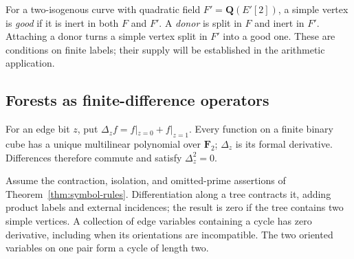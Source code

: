 For a two-isogenous curve with quadratic field $F'=\mathbf Q(E'[2])$,
a simple vertex is \emph{good} if it is inert in both $F$ and $F'$.
A \emph{donor} is split in $F$ and inert in $F'$.  Attaching a donor
turns a simple vertex split in $F'$ into a good one.  These are conditions
on finite labels; their supply will be established in the arithmetic
application.

\subsection{Forests as finite-difference operators}

For an edge bit $z$, put $\Delta_z f=f|_{z=0}+f|_{z=1}$.
Every function on a finite binary cube has a unique multilinear polynomial
over $\mathbf F_2$; $\Delta_z$ is its formal derivative.  Differences
therefore commute and satisfy $\Delta_z^2=0$.

\begin{lemma}\label{gr:forest}
Assume the contraction, isolation, and omitted-prime assertions of
Theorem~\ref{thm:symbol-rules}.  Differentiation along a tree contracts
it, adding product labels and external incidences; the result is zero if
the tree contains two simple vertices.  A collection of edge variables
containing a cycle has zero derivative, including when its orientations
are incompatible.  The two oriented variables on one pair form a cycle
of length two.
\end{lemma}

